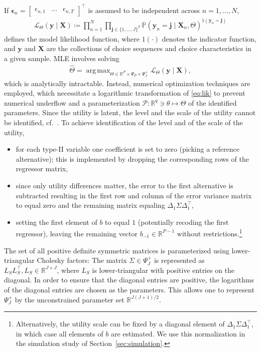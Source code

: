 \documentclass[preprint,12pt,authoryear]{elsarticle}
\newcommand{\R}{\mathbb{R}}
\renewcommand{\Pr}{\mathbb{P}}
\DeclareMathOperator*{\argmax}{arg\,max}
\begin{document}
If $\bm{\epsilon}_n = \begin{bmatrix} \epsilon_{n,1} & \dots & \epsilon_{n,T} \end{bmatrix}^\top$ is assumed to be independent across $n = 1,\dots,N$,
%
\begin{align}
    \label{eq:lik}
    \mathcal{L}_\Theta(\bm{y} \mid \bm{X}) \coloneq \prod_{n = 1}^N \prod_{\bm{j} \in \{1,\dots,J\}^T} \Pr \left( \bm{y}_n = \bm{j} \mid \bm{X}_n, \Theta \right)^{1(\bm{y}_n = \bm{j})}
\end{align}
%
defines the model likelihood function, where $1(\cdot)$ denotes the indicator function, and $\bm{y}$ and $\bm{X}$ are the collections of choice sequences and choice characteristics in a given sample. MLE involves solving
%
\begin{align}
    \label{eq:mle}
    \hat{\Theta} = \argmax_{\Theta \in \R^P \times \Psi_P \times \Psi_J^+} \mathcal{L}_\Theta(\bm{y} \mid \bm{X}),
\end{align}
%
which is analytically intractable. Instead, numerical optimization techniques are employed, which necessitate a logarithmic transformation of \eqref{eq:lik} to prevent numerical underflow and a parameterization $\mathcal{P}: \R^q \ni \theta \mapsto \Theta$ of the identified parameters.
Since the utility is latent, the level and the scale of the utility cannot be identified, cf.\ \citet[Section 5.2]{Train2009}.
To achieve identification of the level and of the scale of the utility,
\begin{itemize}
    \item for each type-II variable one coefficient is set to zero (picking a reference alternative); this is implemented by dropping the corresponding rows of the regressor matrix,
    \item since only utility differences matter, the error to the first alternative is subtracted resulting in the first row and column of the error variance matrix to equal zero and the remaining matrix equaling $\Delta_1 \Sigma \Delta_1^\top$,
    \item setting the first element of $b$ to equal $1$ (potentially recoding the first regressor), leaving the remaining vector $b_{-1} \in \R^{P-1}$ without restrictions.\footnote{Alternatively, the utility scale can be fixed by a diagonal element of $\Delta_1 \Sigma \Delta_1^\top$, in which case all elements of $b$ are estimated. We use this normalization in the simulation study of Section~\ref{sec:simulation}.}
\end{itemize}
%
The set of all positive definite symmetric matrices is parameterized using
lower-triangular Cholesky factors: The matrix $\Sigma \in \Psi_J^+$ is
represented as $L_SL_S^\top, L_S \in \R^{J \times J}$, where $L_S$ is
lower-triangular with positive entries on the diagonal. In order to ensure that the diagonal entries are positive, the logarithms of the diagonal entries are chosen as the parameters. This allows one to represent $\Psi_J^+$ by the unconstrained parameter set $\R^{J(J+1)/2}$.
\end{document}
